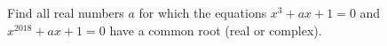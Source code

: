 Find all real numbers $a$ for which the equations $x^3+ax+1=0$ and $x^{2018}+ax+1=0$ have a common root (real or complex).
